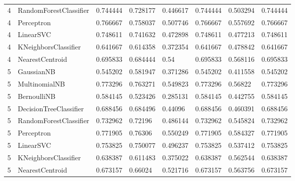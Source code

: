 \documentclass{article}
\begin{document}
\begin{table}[h]
\begin{tabular}{llllllll}
4             & RandomForestClassifier & 0.744444          & 0.728177          & 0.446617              & 0.744444              & 0.503294                 & 0.744444                 \\
4             & Perceptron             & 0.766667          & 0.758037          & 0.507746              & 0.766667              & 0.557692                 & 0.766667                 \\
4             & LinearSVC              & 0.748611          & 0.741632          & 0.472898              & 0.748611              & 0.477213                 & 0.748611                 \\
4             & KNeighborsClassifier   & 0.641667          & 0.614358          & 0.372354              & 0.641667              & 0.478842                 & 0.641667                 \\
4             & NearestCentroid        & 0.695833          & 0.684444          & 0.54                  & 0.695833              & 0.568116                 & 0.695833                 \\
5             & GaussianNB             & 0.545202          & 0.581947          & 0.371286              & 0.545202              & 0.411558                 & 0.545202                 \\
5             & MultinomialNB          & 0.773296          & 0.763271          & 0.549823              & 0.773296              & 0.56822                  & 0.773296                 \\
5             & BernoulliNB            & 0.584145          & 0.523426          & 0.285131              & 0.584145              & 0.442755                 & 0.584145                 \\
5             & DecisionTreeClassifier & 0.688456          & 0.684496          & 0.44096               & 0.688456              & 0.460391                 & 0.688456                 \\
5             & RandomForestClassifier & 0.732962          & 0.72196           & 0.486144              & 0.732962              & 0.545824                 & 0.732962                 \\
5             & Perceptron             & 0.771905          & 0.76306           & 0.550249              & 0.771905              & 0.584327                 & 0.771905                 \\
5             & LinearSVC              & 0.753825          & 0.750077          & 0.496237              & 0.753825              & 0.537412                 & 0.753825                 \\
5             & KNeighborsClassifier   & 0.638387          & 0.611483          & 0.375022              & 0.638387              & 0.562544                 & 0.638387                 \\
5             & NearestCentroid        & 0.673157          & 0.66024           & 0.521716              & 0.673157              & 0.563756                 & 0.673157
\end{tabular}
\end{table}
\end{document}
